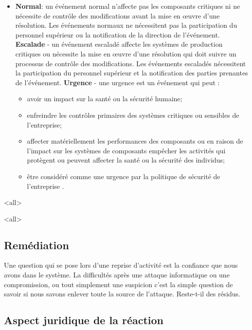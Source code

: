 \begin{itemize}
  \item  \textbf{Normal}: un événement normal n'affecte pas les composants critiques ni ne nécessite de contrôle des modifications avant la mise en œuvre d'une résolution. Les événements normaux ne nécessitent pas la participation du personnel supérieur ou la notification de la direction de l'événement.
\textbf{Escalade} - un événement escaladé affecte les systèmes de production critiques ou nécessite la mise en œuvre d'une résolution qui doit suivre un processus de contrôle des modifications. Les événements escaladés nécessitent la participation du personnel supérieur et la notification des parties prenantes de l'événement.
\textbf{Urgence} - une urgence est un événement qui peut :
\begin{itemize}
  \item avoir un impact sur la santé ou la sécurité humaine;
  \item enfreindre les contrôles primaires des systèmes critiques ou sensibles de l'entreprise;
  \item affecter matériellement les performances des composants ou en raison de l'impact sur les systèmes de composants empêcher les activités qui protègent ou peuvent affecter la santé ou la sécurité des individus;
  \item être considéré comme une urgence par la politique de sécurité de l'entreprise .
\end{itemize}

\end{itemize}

\mode<all>{}

\mode<all>{}

\subsection{Remédiation}


Une question qui se pose lors d’une reprise d’activité est la confiance que nous avons dans le système. La difficultés après une attaque informatique ou une compromission, ou tout simplement une suspicion c’est la simple question de savoir si nous savons enlever toute la source de l’attaque. Reste-t-il des résidus.

\subsection{Aspect juridique de la réaction}

